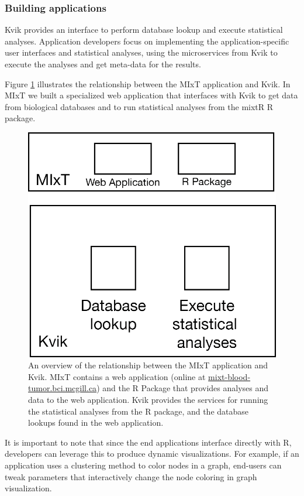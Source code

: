 \subsubsection*{Building applications} 
Kvik provides an interface to perform database lookup and execute statistical
analyses. Application developers focus on implementing the
application-specific user interfaces and statistical analyses, using the
microservices from Kvik to execute the analyses and get meta-data for the
results. 

Figure \ref{kvik-mixt} illustrates the
relationship between the MIxT application and Kvik. In MIxT we built a
specialized web application that interfaces with Kvik to get data from
biological databases and to run statistical analyses from the mixtR R package. 

\begin{figure}[h!]
\centering
\includegraphics{figures/kvik-mixt.png}
\caption{An overview of the relationship between the MIxT application and Kvik.
MIxT contains a web application (online at \url{mixt-blood-tumor.bci.mcgill.ca})
and the R Package that provides analyses and data to the web application. Kvik
provides the services for running the statistical analyses from the R package,
and the database lookups found in the web application.} 
\label{kvik-mixt}
\end{figure} 

It is important to note that since the end applications interface directly with
R, developers can leverage this to produce dynamic visualizations. For example,
if an application uses a clustering method to color nodes in a graph, end-users
can tweak parameters that interactively change the node coloring in graph
visualization.

